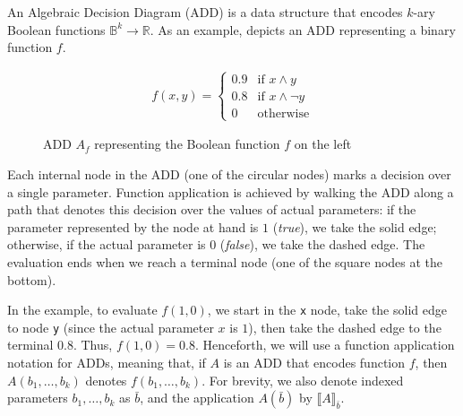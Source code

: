 An Algebraic Decision Diagram (ADD) \cite{ADD} is a data structure that encodes
$k$-ary Boolean functions $\mathbb{B}^k \to \mathbb{R}$.
As an example,  depicts an ADD representing a
binary function $f$.
\begin{figure}[!htb]
    \begin{minipage}{0.45\textwidth}
    \begin{align*}
        \label{eq:example-add}
        f(x, y) = \begin{cases}
            0.9 & \text{if } x \land y \\
            0.8 & \text{if } x \land \lnot y \\
            0   & \text{otherwise}
        \end{cases}
    \end{align*}%
    \end{minipage}%
    \begin{minipage}{0.5\textwidth}
        \centering
    \end{minipage}%
    \caption{ADD $A_f$ representing the Boolean function $f$ on the left}
    \label{fig:example-add}
\end{figure}

Each internal node in the ADD (one of the circular nodes) marks a
decision over a single parameter.
Function application is achieved by walking the ADD along a path that
denotes this decision over the values of actual parameters: if the parameter
represented by the node at hand is $1$ (\textit{true}), we take the solid edge;
otherwise, if the actual parameter is $0$ (\textit{false}), we take the dashed edge.
The evaluation ends when we reach a terminal node (one of the square nodes at
the bottom).

In the example, to evaluate $f(1, 0)$, we start in the \texttt{x} node, take the
solid edge to node \texttt{y} (since the actual parameter $x$ is $1$), then take
the dashed edge to the terminal $0.8$.
Thus, $f(1, 0) = 0.8$.
Henceforth, we will use a function application notation for ADDs, meaning that, if $A$ is an ADD that encodes
function $f$, then $A(b_1, \dotsc, b_k)$ denotes $f(b_1, \dotsc, b_k)$.
For brevity, we also denote indexed parameters $b_1, \dotsc, b_k$ as $\bar{b}$,
and the application $A(\bar{b})$ by $\llbracket A \rrbracket_{\bar{b}}$.

